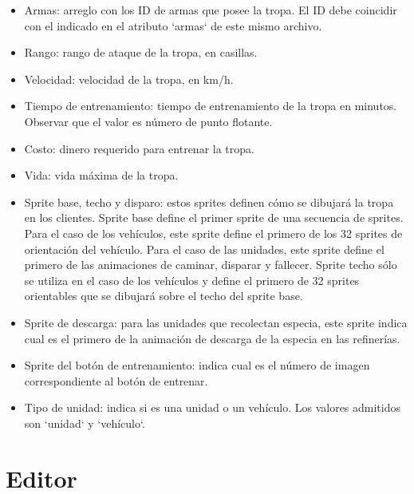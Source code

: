\documentclass[titlepage,a4paper,12pt]{article}
\begin{document}
\begin{itemize}
\begin{itemize}
\item Armas: arreglo con los ID de armas que posee la tropa. El ID debe coincidir con el indicado en el atributo `armas` de este mismo archivo.

\item Rango: rango de ataque de la tropa, en casillas.

\item Velocidad: velocidad de la tropa, en km/h.

\item Tiempo de entrenamiento: tiempo de entrenamiento de la tropa en minutos. Observar que el valor es número de punto flotante.

\item Costo: dinero requerido para entrenar la tropa.

\item Vida: vida máxima de la tropa.

\item Sprite base, techo y disparo: estos sprites definen cómo se dibujará la tropa en los clientes.  Sprite base define el primer sprite de una secuencia de sprites. Para el caso de los vehículos, este sprite define el primero de los 32 sprites de orientación del vehículo. Para el caso de las unidades, este sprite define el primero de las animaciones de caminar, disparar y fallecer.  Sprite techo sólo se utiliza en el caso de los vehículos y define el primero de 32 sprites orientables que se dibujará sobre el techo del sprite base.

\item Sprite de descarga: para las unidades que recolectan especia, este sprite indica cual es el primero de la animación de descarga de la especia en las refinerías.

\item Sprite del botón de entrenamiento: indica cual es el número de imagen correspondiente al botón de entrenar.

\item Tipo de unidad: indica si es una unidad o un vehículo. Los valores admitidos son `unidad` y `vehículo`.

\end{itemize}

\end{itemize}


\newpage
\section{Editor}
\end{document}
